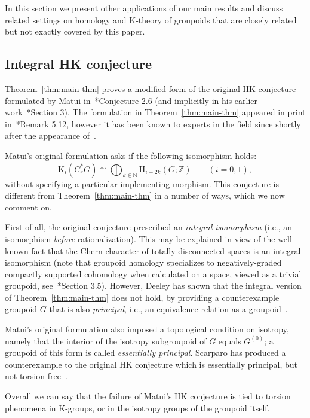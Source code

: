 \documentclass[a4paper,reqno]{amsart}
\theoremstyle{plain}
\theoremstyle{definition}
\theoremstyle{remark}
\numberwithin{equation}{section}
\newcommand{\rH}{\mathrm{H}}
\newcommand{\rK}{\mathrm{K}}
\newcommand{\dN}{\mathbb{N}}
\newcommand{\dZ}{\mathbb{Z}}
\begin{document}
In this section we present other applications of our main results and discuss related settings on homology and $\rK$-theory of groupoids that are closely related but not exactly covered by this paper.

\subsection{Integral HK conjecture}

Theorem~\ref{thm:main-thm} proves a modified form of the original HK conjecture formulated by Matui in~\cite{matui:hkpub}*{Conjecture 2.6} (and implicitly in his earlier work~\cite{matui:hk}*{Section 3}). The formulation in Theorem~\ref{thm:main-thm} appeared in print in~\cite{bdgw:matui}*{Remark 5.12}, however it has been known to experts in the field since shortly after the appearance of~\cite{matui:hkpub}. 

Matui's original formulation asks if the following isomorphism holds:
\[
\rK_i(C^*_r G) \cong \bigoplus_{k \in \dN} \rH_{i + 2 k}(G; \dZ) \qquad (i = 0, 1),
\]
without specifying a particular implementing morphism. This conjecture is different from Theorem~\ref{thm:main-thm} in a number of ways, which we now comment on.

First of all, the original conjecture prescribed an \emph{integral isomorphism} (i.e., an isomorphism \emph{before} rationalization).
This may be explained in view of the well-known fact that the Chern character of totally disconnected spaces is an integral isomorphism (note that groupoid homology specializes to negatively-graded compactly supported cohomology when calculated on a space, viewed as a trivial groupoid, see~\cite{cramo:hom}*{Section 3.5}).
However, Deeley has shown that the integral version of Theorem~\ref{thm:main-thm} does not hold, by providing a counterexample groupoid $G$ that is also \emph{principal}, i.e., an equivalence relation as a groupoid~\cite{deeley:counthk}.

Matui's original formulation also imposed a topological condition on isotropy, namely that the interior of the isotropy subgroupoid of $G$ equals $G^{(0)}$; a groupoid of this form is called \emph{essentially principal}. Scarparo has produced a counterexample to the original HK conjecture which is essentially principal, but not torsion-free~\cite{scarparo:homod}.

Overall we can say that the failure of Matui's HK conjecture is tied to torsion phenomena in $\rK$-groups, or in the isotropy groups of the groupoid itself.
\end{document}
